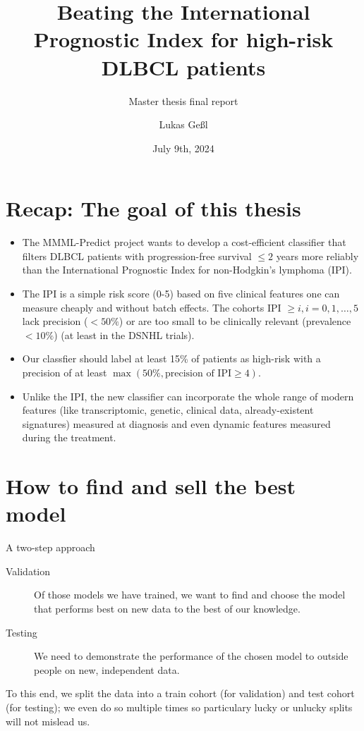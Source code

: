 \documentclass[10pt, aspectratio=169]{beamer}
\title{Beating the International Prognostic Index for high-risk DLBCL patients}
\subtitle{Master thesis final report}
\date{July 9th, 2024}
\author{Lukas Geßl}
\institute{Chair of Statistical Bioinformatics, Regensburg University}
\begin{document}
\maketitle

\section{Recap: The goal of this thesis}

\begin{frame}{}
  \begin{itemize}
    \item The MMML-Predict project wants to develop a cost-efficient classifier 
    that filters DLBCL patients with progression-free survival $\leq 2$ years more reliably 
    than the International Prognostic Index for non-Hodgkin's lymphoma (IPI).
    \item The IPI is a simple risk score (0-5) based on five clinical features one can
    measure cheaply and without batch effects. The cohorts IPI $\geq i, i = 0, 1, \ldots, 5$
    lack precision ($< 50 \%$) or are too small to be clinically relevant
    (prevalence $< 10 \%$) (at least in the DSNHL trials).
    \item Our classfier should label at least 15\% of patients as high-risk with a precision
    of at least $\max(50\%, \text{precision of IPI} \geq 4)$.
    \item Unlike the IPI, the new classifier can incorporate the whole range of 
    modern features (like transcriptomic, genetic, clinical data, already-existent 
    signatures) measured at diagnosis and even dynamic features measured during 
    the treatment.
  \end{itemize}
\end{frame}

\section{How to find and sell the best model}
\begin{frame}{A two-step approach}
  \begin{description}
    \item[Validation] Of those models we have trained, we want to find and choose
       the model that performs best on new data to the best of \alert{our} knowledge.
    \item[Testing] We need to demonstrate the performance of the chosen model to 
      \alert{outside} people on new, independent data.
  \end{description}

  To this end, we split the data into a train cohort (for validation) and test 
  cohort (for testing); we even do so multiple times so particulary lucky or 
  unlucky splits will not mislead us. 
\end{frame}
\end{document}
